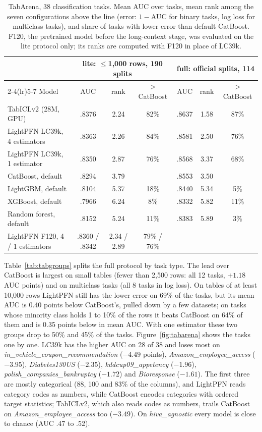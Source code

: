 \documentclass[11pt]{article}
\begin{document}
\begin{table}[t]
\centering
\footnotesize
\setlength{\tabcolsep}{5pt}
\begin{tabular}{lcccccc}
\toprule
& \multicolumn{3}{c}{lite: $\le$1,000 rows, 190 splits} & \multicolumn{3}{c}{full: official splits, 114} \\
\cmidrule(lr){2-4}\cmidrule(lr){5-7}
Model & AUC & rank & $>$ CatBoost & AUC & rank & $>$ CatBoost \\
\midrule
TabICLv2 (28M, GPU) & .8376 & 2.24 & 82\% & .8637 & 1.58 & 87\% \\
\rowcolor{orange!12}
LightPFN LC39k, 4 estimators & .8363 & 2.26 & 84\% & .8581 & 2.50 & 76\% \\
LightPFN LC39k, 1 estimator & .8350 & 2.87 & 76\% & .8568 & 3.37 & 68\% \\
CatBoost, default & .8294 & 3.79 & & .8553 & 3.50 & \\
LightGBM, default & .8104 & 5.37 & 18\% & .8440 & 5.34 & 5\% \\
XGBoost, default & .7966 & 6.24 & 8\% & .8332 & 5.82 & 11\% \\
Random forest, default & .8152 & 5.24 & 11\% & .8383 & 5.89 & 3\% \\
\midrule
LightPFN F120, 4 / 1 estimators & .8360 / .8342 & 2.34 / 2.89 & 79\% / 76\% & & & \\
\bottomrule
\end{tabular}
\caption{TabArena, 38 classification tasks. Mean AUC over tasks, mean rank among the seven configurations above the line
(error: $1-$AUC for binary tasks, log loss for multiclass tasks), and share of tasks with lower error than
default CatBoost. F120, the pretrained model before the long-context stage, was evaluated on the lite protocol
only; its ranks are computed with F120 in place of LC39k.}
\label{tab:tabarena}
\end{table}

Table~\ref{tab:tabgroups} splits the full protocol by task type. The lead over CatBoost is largest on small tables
(fewer than 2,500 rows: all 12 tasks, $+1.18$ AUC points) and on multiclass tasks (all 8 tasks in log loss). On
tables of at least 10,000 rows LightPFN still has the lower error on 69\% of the tasks, but its mean AUC is 0.40
points below CatBoost's, pulled down by a few datasets; on tasks whose minority class holds 1 to 10\% of the rows
it beats CatBoost on 64\% of them and is 0.35 points below in mean AUC. With one estimator these two groups drop
to 50\% and 45\% of the tasks. Figure~\ref{fig:tabarena} shows the tasks one by one. LC39k has the higher AUC on
28 of 38 and loses most on \emph{in\_vehicle\_coupon\_recommendation} ($-4.49$ points), \emph{Amazon\_employee\_access}
($-3.95$), \emph{Diabetes130US} ($-2.35$), \emph{kddcup09\_appetency} ($-1.96$), \emph{polish\_companies\_bankruptcy}
($-1.72$) and \emph{Bioresponse} ($-1.61$). The first three are mostly categorical (88, 100 and 83\% of the
columns), and LightPFN reads category codes as numbers, while CatBoost encodes categories with ordered target
statistics; TabICLv2, which also reads codes as numbers, trails CatBoost on \emph{Amazon\_employee\_access} too
($-3.49$). On \emph{hiva\_agnostic} every model is close to chance (AUC .47 to .52).
\end{document}
